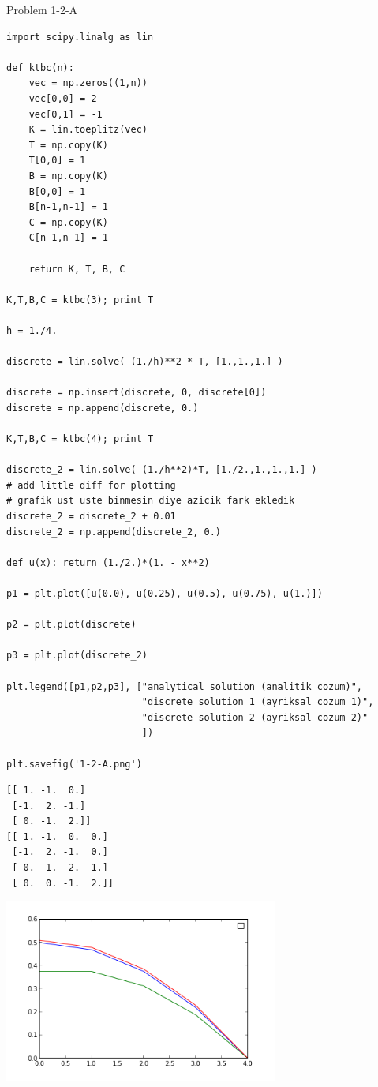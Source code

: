\documentclass[12pt,fleqn]{article}\usepackage{../../common}
\begin{document}
Problem 1-2-A

\begin{verbatim}
import scipy.linalg as lin

def ktbc(n):
    vec = np.zeros((1,n))
    vec[0,0] = 2
    vec[0,1] = -1
    K = lin.toeplitz(vec)
    T = np.copy(K)
    T[0,0] = 1
    B = np.copy(K)
    B[0,0] = 1
    B[n-1,n-1] = 1
    C = np.copy(K)
    C[n-1,n-1] = 1
    
    return K, T, B, C

K,T,B,C = ktbc(3); print T

h = 1./4.

discrete = lin.solve( (1./h)**2 * T, [1.,1.,1.] )

discrete = np.insert(discrete, 0, discrete[0]) 
discrete = np.append(discrete, 0.) 

K,T,B,C = ktbc(4); print T

discrete_2 = lin.solve( (1./h**2)*T, [1./2.,1.,1.,1.] )
# add little diff for plotting
# grafik ust uste binmesin diye azicik fark ekledik
discrete_2 = discrete_2 + 0.01 
discrete_2 = np.append(discrete_2, 0.) 

def u(x): return (1./2.)*(1. - x**2)

p1 = plt.plot([u(0.0), u(0.25), u(0.5), u(0.75), u(1.)])

p2 = plt.plot(discrete)

p3 = plt.plot(discrete_2)

plt.legend([p1,p2,p3], ["analytical solution (analitik cozum)",
                        "discrete solution 1 (ayriksal cozum 1)",
                        "discrete solution 2 (ayriksal cozum 2)"
                        ])

plt.savefig('1-2-A.png')
\end{verbatim}

\begin{verbatim}
[[ 1. -1.  0.]
 [-1.  2. -1.]
 [ 0. -1.  2.]]
[[ 1. -1.  0.  0.]
 [-1.  2. -1.  0.]
 [ 0. -1.  2. -1.]
 [ 0.  0. -1.  2.]]
\end{verbatim}

\includegraphics[height=6cm]{1-2-A.png}
\end{document}
